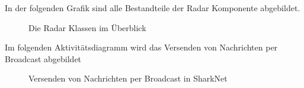 \documentclass[german, 12pt]{book}
\begin{document}
\newpage

In der folgenden Grafik sind alle Bestandteile der Radar Komponente abgebildet.
\begin{figure}[H]
	\centering
	\hspace*{1cm}
	\caption{Die Radar Klassen im Überblick}
	\label{fig:radarAll}
\end{figure}

\newpage

Im folgenden Aktivitätsdiagramm wird das Versenden von Nachrichten per Broadcast abgebildet
\begin{figure}[H]
	\centering
	\hspace*{1cm}
	\caption{Versenden von Nachrichten per Broadcast in SharkNet}
	\label{fig:broadcastSend}
\end{figure}
\end{document}
